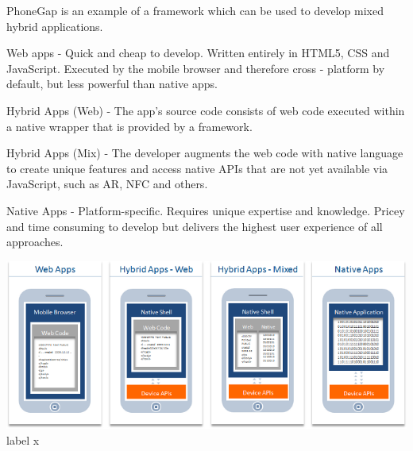 PhoneGap is an example of a framework which can be used to develop mixed hybrid applications.

Web apps - Quick and cheap to develop. Written entirely in HTML5, CSS and JavaScript. Executed by the mobile
browser and therefore cross - platform by default, but less powerful than native apps.
 
Hybrid Apps (Web) - The app's source code consists of web code executed within a native wrapper that is provided by a framework.
 
Hybrid Apps (Mix) - The developer augments the web code with native language to create unique features and
access native APIs that are not yet available via JavaScript, such as AR, NFC and others.
 
Native Apps - Platform-specific. Requires unique expertise and knowledge. Pricey and time consuming to develop but
 delivers the highest user experience of all approaches.

\begin{centering}
\includegraphics[scale=0.5]{images/apptypesdefined.png}\\{label x}\\
\end{centering}














